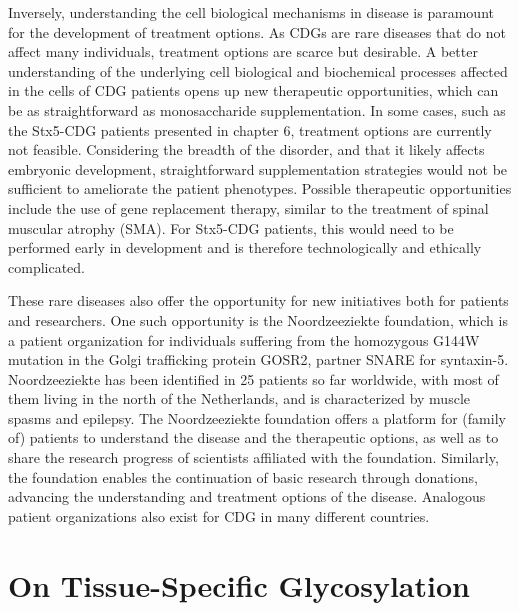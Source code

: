 Inversely, understanding the cell biological mechanisms in disease is paramount for the development of treatment options. As CDGs are rare diseases that do not affect many individuals\cite{linders_sugary_2020}, treatment options are scarce but desirable. A better understanding of the underlying cell biological and biochemical processes affected in the cells of CDG patients opens up new therapeutic opportunities, which can be as straightforward as monosaccharide supplementation\cite{witters_d-galactose_2021,wong_oral_2017,voermans_pgm1_2017}. In some cases, such as the Stx5-CDG patients presented in chapter 6, treatment options are currently not feasible. Considering the breadth of the disorder, and that it likely affects embryonic development, straightforward supplementation strategies would not be sufficient to ameliorate the patient phenotypes. Possible therapeutic opportunities include the use of gene replacement therapy, similar to the treatment of spinal muscular atrophy (SMA)\cite{mendell_single-dose_2017}. For Stx5-CDG patients, this would need to be performed early in development and is therefore technologically and ethically complicated.

These rare diseases also offer the opportunity for new initiatives both for patients and researchers. One such opportunity is the Noordzeeziekte foundation\cite{noauthor_home_nodate}, which is a patient organization for individuals suffering from the homozygous G144W mutation in the Golgi trafficking protein GOSR2\cite{praschberger_mutations_2017,praschberger_expanding_2015,corbett_mutation_2011}, partner SNARE for syntaxin-5. Noordzeeziekte has been identified in 25 patients so far worldwide, with most of them living in the north of the Netherlands, and is characterized by muscle spasms and epilepsy. The Noordzeeziekte foundation offers a platform for (family of) patients to understand the disease and the therapeutic options, as well as to share the research progress of scientists affiliated with the foundation. Similarly, the foundation enables the continuation of basic research through donations, advancing the understanding and treatment options of the disease. Analogous patient organizations also exist for CDG in many different countries\cite{noauthor_cdg_nodate}.

\section{On Tissue-Specific Glycosylation}

